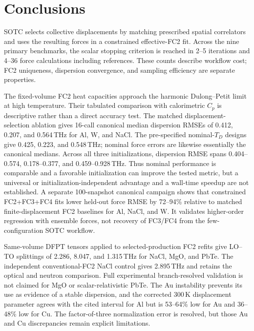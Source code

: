 \documentclass[aps,prb,reprint,amsmath,amssymb,floatfix]{revtex4-2}
\begin{document}
\section{Conclusions}\label{conclusions}

\color{revisionblue}
SOTC selects collective displacements by matching prescribed spatial
correlators and uses the resulting forces in a constrained effective-FC2 fit.
Across the nine primary benchmarks, the scalar stopping criterion is reached in
2--5 iterations and 4--36 force calculations including references. These
counts describe workflow cost; FC2 uniqueness, dispersion convergence, and
sampling efficiency are separate properties.
\color{black}

\color{revisionblue}
The fixed-volume FC2 heat capacities approach the harmonic Dulong--Petit limit at high temperature. Their tabulated comparison with calorimetric \(C_p\) is descriptive rather than a direct accuracy test.
The matched displacement-selection ablation gives 16-call canonical median
dispersion RMSEs of 0.412, 0.207, and 0.564\,THz for Al, W, and NaCl. The
pre-specified nominal-\(T_D\) designs give 0.425, 0.223, and 0.548\,THz;
nominal force errors are likewise essentially the canonical medians. Across
all three initializations, dispersion RMSE spans 0.404--0.574,
0.178--0.377, and 0.459--0.928\,THz. Thus nominal performance is comparable
and a favorable initialization can improve the tested metric, but a universal
or initialization-independent advantage and a wall-time speedup are not
established. A separate 100-snapshot canonical campaign shows
that constrained FC2+FC3+FC4 fits lower held-out force RMSE by 72--94\%
relative to matched finite-displacement FC2 baselines for Al, NaCl, and W.
It validates higher-order regression with ensemble forces, not recovery of
FC3/FC4 from the few-configuration SOTC workflow.
\color{black}

\color{revisionblue}
Same-volume DFPT tensors applied to selected-production FC2 refits give LO--TO
splittings of 2.286, 8.047, and 1.315\,THz for NaCl, MgO, and PbTe. The
independent conventional-FC2 NaCl control gives 2.895\,THz and retains the
optical and neutron comparison. Full experimental branch-resolved validation
is not claimed for MgO or scalar-relativistic PbTe. The Au
instability prevents its use as evidence of a stable dispersion, and the
corrected 300\,K displacement parameter agrees with the cited interval for Al
but is 53--64\% low for Au and 36--48\% low for Cu. The factor-of-three
normalization error is resolved, but those Au and Cu discrepancies remain
explicit limitations.
\color{black}
\end{document}
